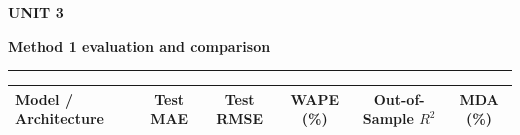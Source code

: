 \documentclass[aspectratio=169, 10pt]{beamer}
\newcommand{\slideheader}[3]{%
        \vspace{-0.25cm}%
        \noindent\begin{minipage}[t]{0.88\linewidth}%
            {\fontsize{7pt}{8.5pt}\selectfont \textbf{\color{BlueAccent}#1}}\par\vspace{1pt}%
            {\fontsize{11.5pt}{13.5pt}\selectfont \textbf{\color{NavyPrimary}#2}}%
        \end{minipage}%
        \hfill%
        \begin{minipage}[t]{0.10\linewidth}%
            \raggedleft{\fontsize{12pt}{14pt}\selectfont \textbf{\color{CoralAccent}#3}}%
        \end{minipage}\par%
        \vspace{2pt}%
        \textcolor{CardBorder}{\rule{\linewidth}{0.6pt}}\par%
        \vspace{3pt}%
    }
\begin{document}
    \begin{frame}[t]                                                                                                                                                                                   
        \slideheader{UNIT 3}{Method 1 evaluation and comparison}{11}                                                                                                                                   
        \vspace{-0.1cm}                                                                                                                                                                                
        \begin{table}[h]                                                                                                                                                                               
            \centering\scriptsize                                                                                                                                                                      
            \begin{tabular}{lccccc}                                                                                                                                                                    
                \toprule                                                                                                                                                                               
                \rowcolor{NavyPrimary!15} \textbf{Model / Architecture} & \textbf{Test MAE} & \textbf{Test RMSE} & \textbf{WAPE (\%)} & \textbf{Out-of-Sample $R^2$} & \textbf{MDA (\%)} \\            
                \midrule                                                                                                                                                                               

\end{tabular}
\end{table}
\end{frame}
\end{document}
